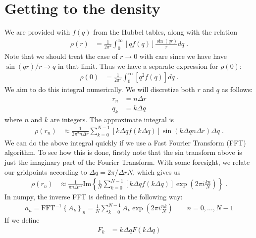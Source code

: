 \documentclass[11pt]{article}
\begin{document}
\section{Getting to the density}

We are provided with $f(q)$ from the Hubbel tables, along with the relation 
\begin{align}
  \rho(r) &= \frac{1}{2 \pi^2} \int_0^\infty     [q f(q)]  \frac{\sin(qr)}{r}dq  \;. \label{eqn:trans}
\end{align}
Note that we should treat the case of $r\rightarrow 0$ with care since we have have $\sin(qr)/r \rightarrow q$ in that limit.  Thus we have a separate expression for $\rho(0)$:
\begin{align}
  \rho(0) &= \frac{1}{2 \pi^2} \int_0^\infty     [q^2 f(q)]  dq  \;. \label{eqn:trans0}
\end{align}
We aim to do this integral numerically.  We will discretize both $r$ and $q$ as follows:
\begin{align}
r_n &= n\Delta r \\
q_k &= k \Delta q
\end{align}
where $n$ and $k$ are integers.  The approximate integral is
\begin{align}
\rho(r_n) &\approx  \frac{1}{2 \pi^2 n\Delta r }\sum_{k=0}^{N-1}     [k \Delta q f(k \Delta q)]  \sin(k \Delta q n\Delta r) \Delta q \; .
\end{align}
We can do the above integral quickly if we use a Fast Fourier Transform (FFT) algorithm.  To see how this is done, firstly note that the sin transform above is just the imaginary part of the Fourier Transform.  With some foresight, we relate our gridpoints according to $\Delta q  = 2\pi / \Delta r N$, which gives us
\begin{align}
\rho(r_n) &\approx  \frac{1}{ \pi n\Delta r^2 }\text{Im}\left\{ \frac{1}{N}\sum_{k=0}^{N-1}     [k \Delta q f(k \Delta q)]  \exp\left(2\pi i \frac{ k  n}{N}\right) \right\} \; .
\end{align}
In numpy, the inverse FFT is defined in the following way:
\begin{align}\label{eqn:idft}
a_n = \text{FFT}^{-1}\left\{ A_k \right\}_n = \frac{1}{N}\sum_{k=0}^{N-1}A_k\exp\left(2\pi i \frac{nk}{N}\right) \qquad n = 0,\ldots,N-1
\end{align}
If we define
\begin{align}
F_k &= k \Delta q F(k \Delta q) 
\end{align}
\end{document}
